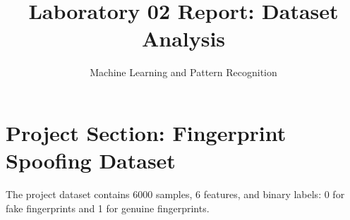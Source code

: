 \documentclass[11pt]{article}
\title{Laboratory 02 Report: Dataset Analysis}
\author{Machine Learning and Pattern Recognition}
\date{}
\begin{document}
\maketitle

\section{Project Section: Fingerprint Spoofing Dataset}

The project dataset contains 6000 samples, 6 features, and binary labels: 0 for fake fingerprints and 1 for genuine fingerprints.


\newpage


\newpage


\end{document}
